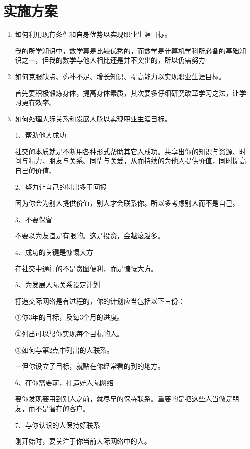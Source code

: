 \documentclass{article}
\begin{document}
\section{实施方案}
\par
\begin{enumerate}[1、]
	\item 如何利用现有条件和自身优势以实现职业生涯目标。\par
我的所学知识中，数学算是比较优秀的，而数学是计算机学科所必备的基础知识之一，但我的数学与他人相比还是并不突出的，所以仍需努力\par
	\item 如何克服缺点、弥补不足、增长知识、提高能力以实现职业生涯目标。\par
首先要积极锻炼身体，提高身体素质，其次要多仔细研究改革学习之法，让学习更有效率。\par
	\item 如何处理人际关系和发展人脉以实现职业生涯目标。\par
	1、帮助他人成功	\par
	社交的本质就是不断用各种形式帮助其它人成功。共享出你的知识与资源、时间与精力、朋友与关系、同情与关爱，从而持续的为他人提供价值，同时提高自己的价值。\par	
	2、努力让自己的付出多于回报\par	
	因为你会为别人提供价值，别人才会联系你。所以多考虑别人而不是自己。\par
	3、不要保留	\par
	不要以为友谊是有限的。这是投资，会越滚越多。\par
	4、成功的关键是慷慨大方\par	
	在社交中通行的不是贪图便利，而是慷慨大方。\par	
	5、为发展人际关系设定计划\par	
	打造交际网络是有过程的，你的计划应当包括以下三份：\par	
	①你3年的目标，及每3个月的进度。\par	
	②列出可以帮你实现每个目标的人。\par
	③如何与第2点中列出的人联系。\par
	一但你设立了目标，就贴在你经常看的到的地方。\par
	6、在你需要前，打造好人际网络\par
	要你发现要用到别人之前，就尽早的保持联系。重要的是把这些人当做是朋友，而不是潜在的客户。\par
	7、与你认识的人保持好联系\par
	刚开始时，要关注于你当前人际网络中的人。\par

\end{enumerate}
\end{document}
